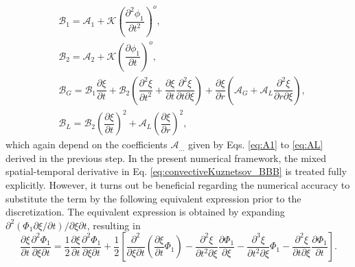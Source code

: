 \begin{align}
     & \mathcal{B}_1 = \mathcal{A}_1 + \mathcal{K}\left(\dfrac{\partial^2 \phi_1}{\partial t^2}\right)^o,
    \label{eq:B1}                                                                                                                                   \\
     & \mathcal{B}_2 = \mathcal{A}_2 + \mathcal{K}\left(\dfrac{\partial \phi_1}{\partial t}\right)^o,
    \label{eq:B2}                                                                                                                                   \\
     & \mathcal{B}_G =
    \mathcal{B}_1\dfrac{\partial \xi}{\partial t}
    + \mathcal{B}_2\left(\dfrac{\partial^2\xi}{\partial t^2} + \dfrac{\partial \xi}{\partial t} \dfrac{\partial^2\xi}{\partial t\partial \xi}\right)
    + \dfrac{\partial \xi}{\partial r}\left(\mathcal{A}_G
    + \mathcal{A}_L\dfrac{\partial^2\xi}{\partial r\partial \xi}\right),
    \label{eq:BG}                                                                                                                                   \\
     & \mathcal{B}_L = \mathcal{B}_2\left(\dfrac{\partial \xi}{\partial t}\right)^2 + \mathcal{A}_L\left(\dfrac{\partial \xi}{\partial r}\right)^2,
    \label{eq:BL}
\end{align}
which again depend on the coefficients $\mathcal{A}_{...}$ given by Eqs. \eqref{eq:A1} to \eqref{eq:AL} derived in the previous step. In the present numerical framework, the mixed spatial-temporal derivative in Eq. \eqref{eq:convectiveKuznetsov_BBB} is treated fully explicitly. However, it turns out be beneficial regarding the numerical accuracy to substitute the term by the following equivalent expression prior to the discretization. The equivalent expression is obtained by expanding $\partial^2\left(\Phi_1\partial\xi/\partial t\right)/\partial \xi \partial t$, resulting in
\begin{equation}
    \dfrac{\partial \xi}{\partial t} \dfrac{\partial^2 \Phi_1}{\partial \xi\partial t}
    = \dfrac{1}{2}\dfrac{\partial \xi}{\partial t} \dfrac{\partial^2 \Phi_1}{\partial \xi\partial t} +
    \dfrac{1}{2}\left[
        \dfrac{\partial^2}{\partial \xi\partial t}\left(\dfrac{\partial \xi}{\partial t}\Phi_1\right)
        - \dfrac{\partial^2 \xi}{\partial t^2 \partial \xi} \dfrac{\partial \Phi_1}{\partial \xi}
        - \dfrac{\partial^3 \xi}{\partial t^2\partial \xi}\Phi_1
        - \dfrac{\partial^2 \xi}{\partial t \partial \xi} \dfrac{\partial \Phi_1}{\partial t}\right].
    \label{eq:mixedTerm}
\end{equation}
